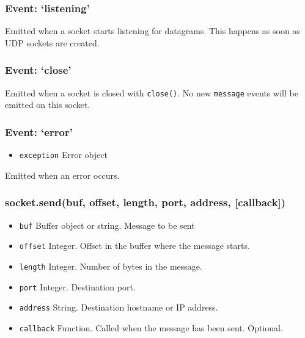 \begin{Shaded}
\end{Shaded}

\subsubsection{Event: `listening'}\label{event-listening}

Emitted when a socket starts listening for datagrams. This happens as
soon as UDP sockets are created.

\subsubsection{Event: `close'}\label{event-close}

Emitted when a socket is closed with \texttt{close()}. No new
\texttt{message} events will be emitted on this socket.

\subsubsection{Event: `error'}\label{event-error}

\begin{itemize}
\itemsep1pt\parskip0pt
\item
  \texttt{exception} Error object
\end{itemize}

Emitted when an error occurs.

\subsubsection{socket.send(buf, offset, length, port, address,
{[}callback{]})}\label{socket.sendbuf-offset-length-port-address-callback}

\begin{itemize}
\itemsep1pt\parskip0pt
\item
  \texttt{buf} Buffer object or string. Message to be sent
\item
  \texttt{offset} Integer. Offset in the buffer where the message
  starts.
\item
  \texttt{length} Integer. Number of bytes in the message.
\item
  \texttt{port} Integer. Destination port.
\item
  \texttt{address} String. Destination hostname or IP address.
\item
  \texttt{callback} Function. Called when the message has been sent.
  Optional.
\end{itemize}

